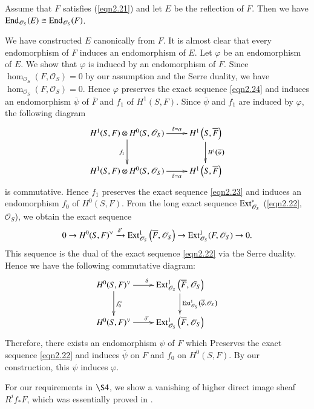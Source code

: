 \setcounter{dfn}{24}
\begin{Prop}\label{Prop2.25}
Assume that $F$ satisfies (\ref{eqn2.21}) and let $E$ be the
reflection of $F$. Then we have $\mathrm{End}_{\mathscr{O}_S}(E)\cong
\mathrm{End}_{\mathscr{O}_S}(F)$. 
\end{Prop}

\begin{Proof}
We have constructed $E$ canonically from $F$. It is almost clear that
every endomorphism of $F$ induces an endomorphism of $E$. Let
$\varphi$ be an endomorphism of $E$. We show that $\varphi$ is induced
by an endomorphism of $F$. Since
$\hom_{\mathscr{O}_S}(F,\mathscr{O}_S)=0$ by our assumption and the
Serre duality, we have
$\hom_{\mathscr{O}_S}(F,\mathscr{O}_S)=0$. Hence $\varphi$ preserves
the exact sequence \eqref{eqn2.24} and induces an endomorphism
$\overline{\psi}$ of $\overline{F}$ and $f_1$ of $H^{1}(S,F)$. Since
$\overline{\psi}$ and $f_1$ are induced by $\varphi$, the following
diagram  
$$
\xymatrix{H^{1}(S,F)\otimes\ar[d]_{f_1} H^{0}(S,\mathscr{O}_S)\ar[r]^-{\delta=\alpha}&H^{1}\left(S,\overline{F}\right)\ar[d]^{H^{1}\left(\overline{\psi}\right)}\\
H^{1}(S,F)\otimes H^{0}(S,\mathscr{O}_S)\ar[r]_-{\delta=\alpha}&H^{1}\left(S,\overline{F}\right)}
$$\pageoriginale
is commutative. Hence $f_1$ preserves the exact sequence
\eqref{eqn2.23} and induces an endomorphism $f_0$ of
$H^{0}(S,F)$. From the long exact sequence
$\mathrm{Ext}^{\ast}_{\mathscr{O}_S}$ (\eqref{eqn2.22}, $\mathscr{O}_S$), we
obtain the exact sequence 
$$
0\to
H^{0}(S,F)^{\vee}\xrightarrow{\delta'}\mathrm{Ext}^{1}_{\mathscr{O}_S}\left(\overline{F},\mathscr{O}_S\right)\to \mathrm{Ext}^{1}_{\mathscr{O}_S
}(F,\mathscr{O}_S)\to 0. 
$$
This sequence is the dual of the exact sequence \eqref{eqn2.22} via
the Serre duality. Hence we have the following commutative diagram:
$$
\xymatrix{H^{0}(S,F)^{\vee}\ar[d]^{f^{\vee}_0}\ar[r]^{\delta}&\ext^{1}_{\mathscr{O}_S}\left(\overline{F},\mathscr{O}_S\right)\ar[d]^{\ext^{1}_{\mathscr{O}_S}\left(\overline{\psi},\mathscr{O}_{S}\right)}\\
H^{0}(S,F)^{\vee}\ar[r]^{\delta'}&\ext^{1}_{\mathscr{O}_S}\left(\overline{F},\mathscr{O}_S\right)}
$$
Therefore, there exists an endomorphism $\psi$ of $F$ which Preserves
the exact sequence \eqref{eqn2.22} and induces $\overline{\psi}$ on
$F$ and $f_0$ on $H^{0}(S,F)$. By our construction, this $\psi$
induces $\varphi$. 
\end{Proof}

For our requirements in $\S 4$, we show a vanishing of higher direct
image sheaf $R^{i}f_{\ast}F$, which was essentially proved in \cite{key15}.

